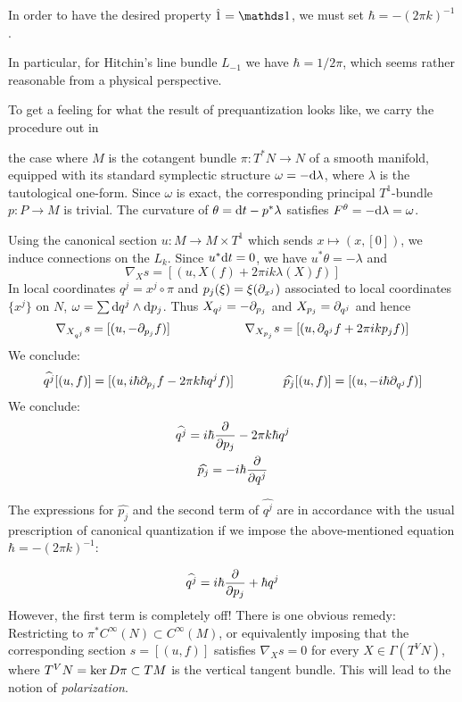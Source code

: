\documentclass[parskip=half]{scrartcl}
\begin{document}
\begin{rem}
	\begin{onboard}
	In order to have the desired property $\hat 1=\Unit$, we must set $\hbar=-(2\pi k)^{-1}$.
	\end{onboard}
	In particular, for Hitchin's line bundle $L_{-1}$ we have $\hbar=1/2\pi$, which seems rather reasonable from a physical perspective.
\end{rem}

\begin{ex}
	To get a feeling for what the result of prequantization looks like, we carry the procedure out in 
	\begin{onboard}
	the case where $M$ is the cotangent bundle $\pi:T^*N\to N$ of a smooth manifold, equipped with its standard symplectic structure $\omega=-\mathrm{d} \lambda$, where $\lambda$ is the tautological one-form.
	Since $\omega$ is exact, the corresponding principal $T^1$-bundle $p:P\to M$ is trivial. The curvature of $\theta=\mathrm{d} t-p^*\lambda$ satisfies $F^\theta=-\mathrm{d} \lambda=\omega$. 
	
	Using the canonical section $u:M\to M\times T^1$ which sends $x\mapsto (x,[0])$, we induce connections on the $L_k$. Since $u^*\mathrm{d} t=0$, we have $u^*\theta=-\lambda$ and
	\begin{equation*}
		\nabla_X s = [(u,X(f)+2\pi i k \lambda (X)f)]
	\end{equation*}
	In local coordinates $q^j=x^j\circ \pi$ and $p_j(\xi)=\xi(\partial_{x^j})$ associated to local coordinates $\{x^j\}$ on $N$, $\omega=\sum \mathrm{d} q^j \wedge \mathrm{d} p_j$. Thus $X_{q^j}=-\partial_{p_j}$ and $X_{p_j}=\partial_{q^j}$ and hence
	\begin{equation*}
		\nabla_{X_{q^j}}s=[(u,-\partial_{p_j}f)] \qquad \qquad \qquad 
		\nabla_{X_{p_j}}s=[(u,\partial_{q^j}f+2\pi i k p_jf)]
	\end{equation*}
	We conclude:
	\begin{equation*}
		\widehat{q^j}[(u,f)]=[(u,i\hbar \partial_{p_j}f-2\pi k \hbar q^jf)]\qquad \qquad 
		\widehat{p_j}[(u,f)]=[(u,-i\hbar \partial_{q^j}f)]
	\end{equation*}
	We conclude:
	\begin{gather*}
		\widehat{q^j}=i\hbar\frac{\partial }{\partial p_j} -2\pi k \hbar q^j\\
		\widehat{p_j}=-i\hbar \frac{\partial }{\partial q^j}
	\end{gather*}
	\end{onboard}
	The expressions for $\widehat{p_j}$ and the second term of $\widehat{q^j}$ are in accordance with the usual prescription of canonical quantization if we impose the above-mentioned equation $\hbar =-(2\pi k)^{-1}$:
	\begin{onboard}
	\begin{equation*}
		\widehat{q^j}=i\hbar\frac{\partial }{\partial p_j} + \hbar q^j
	\end{equation*}
	However, the first term is completely off! There is one obvious remedy: Restricting to $\pi^*C^\infty(N)\subset C^\infty(M)$, or equivalently imposing that the corresponding section $s=[(u,f)]$ satisfies $\nabla_X s=0$ for every $X\in \Gamma(T^VN)$, where $T^VN=\ker D \pi\subset TM$ is the vertical tangent bundle. This will lead  to the notion of \emph{polarization}.
	\end{onboard}
\end{ex}
\end{document}
